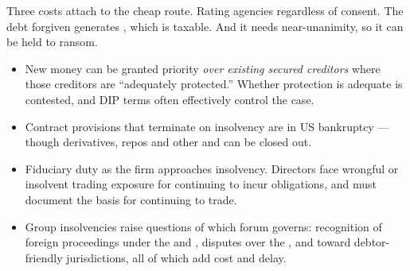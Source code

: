 \begin{imkeybox}[title={Why a distressed exchange is not a free lunch}]
Three costs attach to the cheap route. Rating agencies  regardless of consent. The debt forgiven generates , which is taxable. And it needs near-unanimity, so it can be
held to ransom.
\end{imkeybox}


\begin{itemize}
\item {} New money can be granted priority
\emph{over existing secured creditors} where those creditors are
``adequately protected.'' Whether protection is adequate is contested, and DIP
terms often effectively control the case.
\item {} Contract provisions that terminate on insolvency
are  in US bankruptcy --- though derivatives, repos
and other  and can be
closed out.
\item {} Fiduciary duty  as the firm approaches insolvency. Directors face wrongful or
insolvent trading exposure for continuing to incur obligations, and must document
the basis for continuing to trade.
\item {} Group insolvencies raise questions of which
forum governs: recognition of foreign proceedings under the  and , disputes over the , and
 toward debtor-friendly jurisdictions, all of which add cost
and delay.
\end{itemize}

